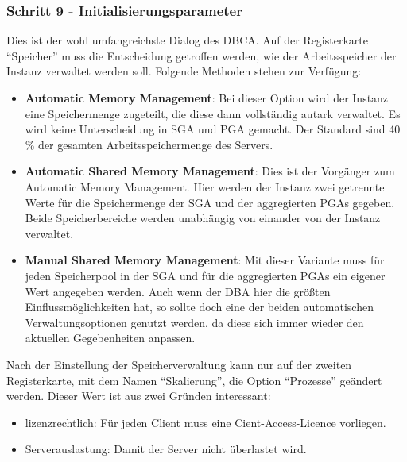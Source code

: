         \subsubsection{Schritt 9 - Initialisierungsparameter}
          Dies ist der wohl umfangreichste Dialog des DBCA. Auf der
          Registerkarte \enquote{Speicher} muss die Entscheidung getroffen
          werden, wie der Arbeitsspeicher der Instanz verwaltet werden soll.
          Folgende Methoden stehen zur Verfügung:
          \begin{itemize}
            \item \textbf{Automatic Memory Management}: Bei dieser Option wird der Instanz eine Speichermenge zugeteilt, die diese dann vollständig autark verwaltet. Es wird keine Unterscheidung in SGA und PGA gemacht. Der Standard sind 40 \% der gesamten Arbeitsspeichermenge des Servers.
            \item \textbf{Automatic Shared Memory Management}: Dies ist der Vorgänger zum Automatic Memory Management. Hier werden der Instanz zwei getrennte Werte für die Speichermenge der SGA und der aggregierten PGAs gegeben. Beide Speicherbereiche werden unabhängig von einander von der Instanz verwaltet.
            \item \textbf{Manual Shared Memory Management}: Mit dieser Variante
            muss für jeden Speicherpool in der SGA und für die aggregierten
            PGAs ein eigener Wert angegeben werden. Auch wenn der DBA hier die
            größten Einflussmöglichkeiten hat, so sollte doch eine der
            beiden automatischen Verwaltungsoptionen genutzt werden, da diese
            sich immer wieder den aktuellen Gegebenheiten anpassen.
          \end{itemize}
          Nach der Einstellung der Speicherverwaltung kann nur auf der zweiten
          Registerkarte, mit dem Namen \enquote{Skalierung}, die Option
          \enquote{Prozesse} geändert werden. Dieser Wert ist aus zwei
          Gründen interessant:
          \begin{itemize}
            \item lizenzrechtlich: Für jeden Client muss eine
            Cient-Access-Licence vorliegen.
            \item Serverauslastung: Damit der Server nicht überlastet wird.
          \end{itemize}
